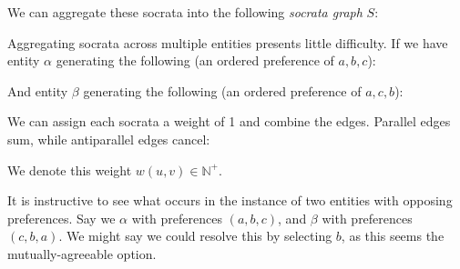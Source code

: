 We can aggregate these socrata into the following \textit{socrata graph} $S$:

\begin{center}
\end{center}

Aggregating socrata across multiple entities presents little difficulty.
If we have entity $\alpha$ generating the following (an ordered preference of $a, b, c$):

\begin{center}




\end{center}

And entity $\beta$ generating the following (an ordered preference of $a, c, b$):

\begin{center}




\end{center}


We can assign each socrata a weight of 1 and combine the edges.
Parallel edges sum, while antiparallel edges cancel:

\begin{center}
\end{center}

We denote this weight $w(u,v) \in \mathbb{N}^+$.

It is instructive to see what occurs in the instance of two entities with opposing preferences.
Say we $\alpha$ with preferences $(a, b, c)$, and $\beta$ with preferences $(c, b, a)$.
We might say we could resolve this by selecting $b$, as this seems the mutually-agreeable option.

